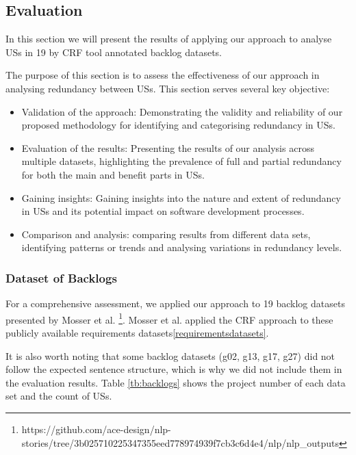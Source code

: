 \subsection{Evaluation}\label{redundancy_evaluation}
In this section we will present the results of applying our approach to analyse USs in 19 by CRF tool annotated backlog datasets. 

The purpose of this section is to assess the effectiveness of our approach in analysing redundancy between USs. This section serves several key objective:
\begin{itemize}
	\item Validation of the approach: Demonstrating the validity and reliability of our proposed methodology for identifying and categorising redundancy in USs.
	\item Evaluation of the results: Presenting the results of our analysis across multiple datasets, highlighting the prevalence of full and partial redundancy for both the main and benefit parts in USs.
	\item Gaining insights: Gaining insights into the nature and extent of redundancy in USs and its potential impact on software development processes.
	\item Comparison and analysis: comparing results from different data sets, identifying patterns or trends and analysing variations in redundancy levels.
\end{itemize}
\subsubsection*{Dataset of Backlogs}
For a comprehensive assessment, we applied our approach to 19 backlog datasets presented by Mosser et al. \footnote{https://github.com/ace-design/nlp-stories/tree/3b025710225347355eed778974939f7cb3c6d4e4/nlp/nlp\_outputs}. Mosser et al. applied the CRF approach to these publicly available requirements datasets\ref{requirementsdatasets}.

It is also worth noting that some backlog datasets (g02, g13, g17, g27) did not follow the expected sentence structure, which is why we did not include them in the evaluation results.
Table \ref{tb:backlogs} shows the project number of each data set and the count of USs.
 
